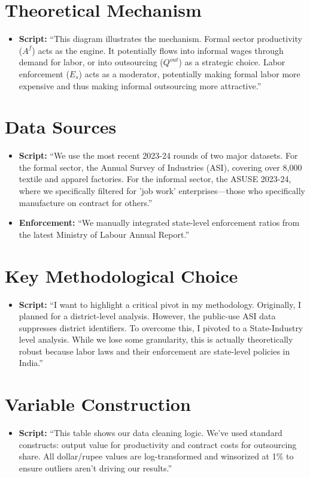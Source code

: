 \documentclass[11pt]{article}
\begin{document}
\section{Theoretical Mechanism}
\begin{itemize}
    \item \textbf{Script:} ``This diagram illustrates the mechanism. Formal sector productivity ($A^f$) acts as the engine. It potentially flows into informal wages through demand for labor, or into outsourcing ($Q^{out}$) as a strategic choice. Labor enforcement ($E_s$) acts as a moderator, potentially making formal labor more expensive and thus making informal outsourcing more attractive.''
\end{itemize}

\section{Data Sources}
\begin{itemize}
    \item \textbf{Script:} ``We use the most recent 2023-24 rounds of two major datasets. For the formal sector, the Annual Survey of Industries (ASI), covering over 8,000 textile and apparel factories. For the informal sector, the ASUSE 2023-24, where we specifically filtered for 'job work' enterprises—those who specifically manufacture on contract for others.''
    \item \textbf{Enforcement:} ``We manually integrated state-level enforcement ratios from the latest Ministry of Labour Annual Report.''
\end{itemize}

\section{Key Methodological Choice}
\begin{itemize}
    \item \textbf{Script:} ``I want to highlight a critical pivot in my methodology. Originally, I planned for a district-level analysis. However, the public-use ASI data suppresses district identifiers. To overcome this, I pivoted to a State-Industry level analysis. While we lose some granularity, this is actually theoretically robust because labor laws and their enforcement are state-level policies in India.''
\end{itemize}

\section{Variable Construction}
\begin{itemize}
    \item \textbf{Script:} ``This table shows our data cleaning logic. We've used standard constructs: output value for productivity and contract costs for outsourcing share. All dollar/rupee values are log-transformed and winsorized at 1\% to ensure outliers aren't driving our results.''
\end{itemize}
\end{document}
